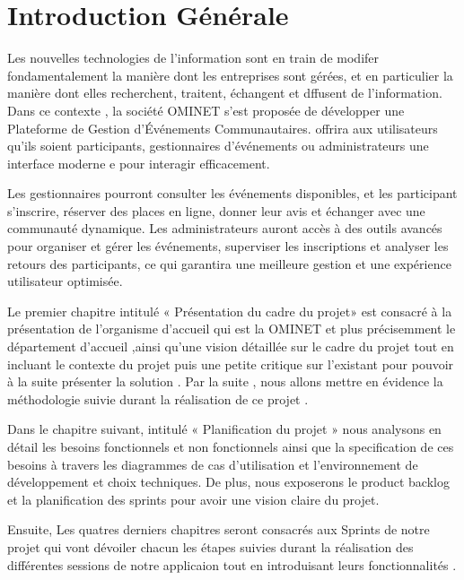 \chapter*{Introduction Générale}


Les nouvelles technologies de l’information sont en train de modifer fondamentalement la
manière dont les entreprises sont gérées, et en particulier la manière dont elles recherchent,
traitent, échangent et dffusent de l’information.
Dans ce contexte , la société OMINET  s’est proposée de développer une Plateforme de Gestion d’Événements Communautaires.
 offrira aux utilisateurs qu’ils soient  participants, gestionnaires d’événements ou administrateurs une interface moderne e pour interagir efficacement.

Les gestionnaires pourront consulter les événements disponibles, et les participant s’inscrire, réserver des places en ligne, donner leur avis et échanger avec une communauté dynamique. Les administrateurs auront accès à des outils avancés pour organiser et gérer les événements, superviser les inscriptions et analyser les retours des participants, ce qui garantira une meilleure gestion et une expérience utilisateur optimisée.

Le premier chapitre intitulé « Présentation du cadre du projet» est consacré à la présentation de
l’organisme d’accueil qui est la OMINET et plus précisemment le département d’accueil ,ainsi qu’une
vision détaillée sur le cadre du projet tout en incluant le contexte du projet puis une petite
critique sur l’existant pour pouvoir à la suite présenter la solution .  Par la suite , nous allons
mettre en évidence la méthodologie suivie durant la réalisation de ce projet . 

Dans le chapitre suivant, intitulé « Planification du projet  » nous analysons en détail les besoins
fonctionnels et non fonctionnels ainsi que la specification de ces besoins à travers les diagrammes
de cas d’utilisation et l'environnement de développement et choix techniques.  De plus, nous exposerons le product backlog
et la planification des sprints pour avoir une vision claire du projet.

Ensuite, Les quatres derniers chapitres seront consacrés aux Sprints de notre projet
qui vont dévoiler chacun les étapes suivies durant la réalisation des différentes sessions de notre
applicaion tout en introduisant leurs fonctionnalités .
